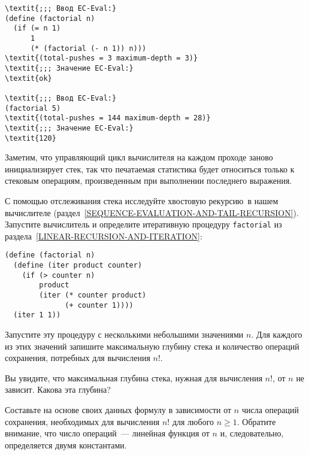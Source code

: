 \begin{Verbatim}[fontsize=\small]
\textit{;;; Ввод EC-Eval:}
(define (factorial n)
  (if (= n 1)
      1
      (* (factorial (- n 1)) n)))
\textit{(total-pushes = 3 maximum-depth = 3)}
\textit{;;; Значение EC-Eval:}
\textit{ok}

\textit{;;; Ввод EC-Eval:}
(factorial 5)
\textit{(total-pushes = 144 maximum-depth = 28)}
\textit{;;; Значение EC-Eval:}
\textit{120}
\end{Verbatim}
Заметим, что управляющий цикл вычислителя на каждом проходе заново
инициализирует стек, так что печатаемая статистика будет относиться
только к стековым операциям, произведенным при выполнении последнего
выражения.
\begin{exercise}{5.26}%
\label{EX5.26}%
С помощью отслеживания стека исследуйте  хвостовую рекурсию~в нашем вычислителе 
(раздел~\ref{SEQUENCE-EVALUATION-AND-TAIL-RECURSION}).
Запустите вычислитель и определите итеративную процедуру
{\tt factorial} из раздела~\ref{LINEAR-RECURSION-AND-ITERATION}:

\begin{Verbatim}[fontsize=\small]
(define (factorial n)
  (define (iter product counter)
    (if (> counter n)
        product
        (iter (* counter product)
              (+ counter 1))))
  (iter 1 1))
\end{Verbatim}
Запустите эту процедуру с несколькими небольшими значениями
$n$.  Для каждого из этих значений запишите максимальную
глубину стека и количество операций сохранения, потребных для
вычисления $n!$.

\begin{plainenum}


\item
Вы увидите, что максимальная глубина стека,
нужная для вычисления $n!$, от $n$ не зависит.
Какова эта глубина?

\item
Составьте на основе своих данных формулу в
зависимости от $n$ числа операций сохранения, необходимых
для вычисления $n!$ для любого $n \ge 1$.
Обратите внимание, что число операций~--- линейная функция от
$n$ и, следовательно, определяется двумя константами.
\end{plainenum}
\end{exercise}
